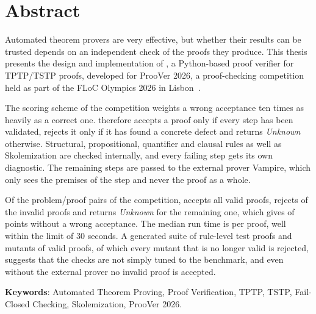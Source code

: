 \section*{Abstract}

{\setlength{\parindent}{0pt}\setlength{\parskip}{0.7\baselineskip}

Automated theorem provers are very effective, but whether their results can be trusted depends on an independent check of the proofs they produce.
This thesis presents the design and implementation of \TSTPy{}, a Python-based proof verifier for TPTP/TSTP proofs, developed for ProoVer 2026, a proof-checking competition held as part of the FLoC Olympics 2026 in Lisbon~\citep{proover-competition}.

The scoring scheme of the competition weights a wrong acceptance ten times as heavily as a correct one.
\TSTPy{} therefore accepts a proof only if every step has been validated, rejects it only if it has found a concrete defect and returns \emph{Unknown} otherwise.
Structural, propositional, quantifier and clausal rules as well as Skolemization are checked internally, and every failing step gets its own diagnostic.
The remaining steps are passed to the external prover Vampire, which only sees the premises of the step and never the proof as a whole.

Of the \EvalOffN{} problem/proof pairs of the competition, \TSTPy{} accepts all \EvalOffValid{} valid proofs, rejects \EvalOffRejInvalid{} of the \EvalOffInvalid{} invalid proofs and returns \emph{Unknown} for the remaining one, which gives \EvalOffScore{} of \EvalOffMaxScore{} points without a wrong acceptance.
The median run time is \EvalWallMedian{} per proof, well within the limit of 30 seconds.
A generated suite of rule-level test proofs and \EvalMutN{} mutants of valid proofs, of which every mutant that is no longer valid is rejected, suggests that the checks are not simply tuned to the benchmark, and even without the external prover no invalid proof is accepted.

\vspace{\baselineskip}
\textbf{Keywords}: Automated Theorem Proving, Proof Verification, TPTP, TSTP, Fail-Closed Checking, Skolemization, ProoVer 2026.
\par}
